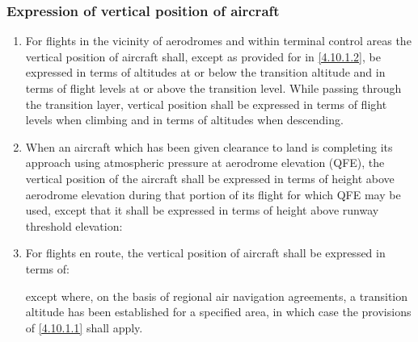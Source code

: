 \documentclass[../main.tex]{subfiles}
\begin{document}
    \subsubsection{Expression of vertical position of aircraft}

    \begin{enumerate}
        \item \label{4.10.1.1} For flights in the vicinity of aerodromes and within terminal control areas the vertical position of aircraft shall, except as provided for in \ref{4.10.1.2}, be expressed in terms of altitudes at or below the transition altitude and in terms of flight levels at or above the transition level. While passing through the transition layer, vertical position shall be expressed in terms of flight levels when climbing and in terms of altitudes when descending.
        \item \label{4.10.1.2} When an aircraft which has been given clearance to land is completing its approach using atmospheric pressure at aerodrome elevation (QFE), the vertical position of the aircraft shall be expressed in terms of height above aerodrome elevation during that portion of its flight for which QFE may be used, except that it shall be expressed in terms of height above runway threshold elevation:


        \item For flights en route, the vertical position of aircraft shall be expressed in terms of:


        \noindent except where, on the basis of regional air navigation agreements, a transition altitude has been established for a specified area, in which case the provisions of \ref{4.10.1.1} shall apply.
    \end{enumerate}
\end{document}
